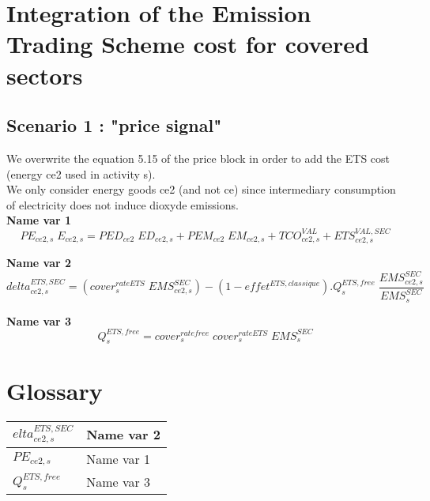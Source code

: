 \documentclass[12pt]{article}
\numberwithin{equation}{section}
\begin{document}
\section{Integration of the Emission Trading Scheme cost for covered sectors}





\subsection{Scenario 1 : "price signal"}


We overwrite the equation 5.15 of the price block in order to add the ETS cost (energy ce2 used in activity s). \\
We only consider energy goods ce2 (and not ce) since intermediary consumption of electricity does not induce dioxyde emissions. \\

\noindent\textbf{Name var 1} \\
\begin{dmath}
PE_{ce2, s} \; E_{ce2, s} = PED_{ce2} \; ED_{ce2, s} + PEM_{ce2} \; EM_{ce2, s} + TCO^{VAL}_{ce2, s} + ETS^{VAL,SEC}_{ce2, s}
\end{dmath}





\noindent\textbf{Name var 2} \\
\begin{dmath}
delta^{ETS,SEC}_{ce2, s} = \left( cover^{rateETS}_{s} \; EMS^{SEC}_{ce2, s} \right) - \left( 1 - effet^{ETS,classique} \right) . Q^{ETS,free}_{s} \; \frac{EMS^{SEC}_{ce2, s}}{EMS^{SEC}_{s}}
\end{dmath}


\noindent\textbf{Name var 3} \\
\begin{dmath}
Q^{ETS,free}_{s} = cover^{ratefree}_{s} \; cover^{rateETS}_{s} \; EMS^{SEC}_{s}
\end{dmath}
































\newpage
        \section{Glossary}
        \normalsize
        \begin{longtable}{@{}p{4cm}p{9cm}@{}} 
$elta^{ETS,SEC}_{ce2, s}$ & Name var 2 \\
 \midrule 
$PE_{ce2, s}$ & Name var 1 \\
 \midrule 
$Q^{ETS,free}_{s}$ & Name var 3 \\
\end{longtable}
\end{document}
